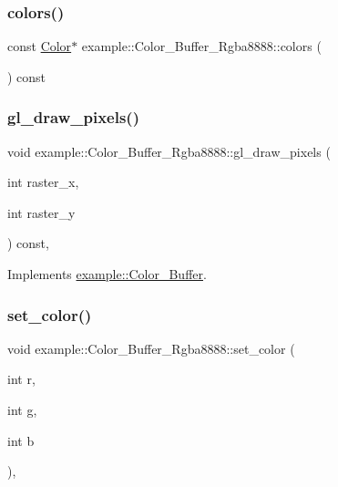 \subsubsection{\texorpdfstring{colors()}{colors()}\hspace{0.1cm}{\footnotesize\ttfamily [2/2]}}
{\footnotesize\ttfamily const \mbox{\hyperlink{structexample_1_1_color___buffer___rgba8888_1_1_color}{Color}}$\ast$ example\+::\+Color\+\_\+\+Buffer\+\_\+\+Rgba8888\+::colors (\begin{DoxyParamCaption}{ }\end{DoxyParamCaption}) const\hspace{0.3cm}{\ttfamily [inline]}}

\mbox{\label{classexample_1_1_color___buffer___rgba8888_a66e133b6fd196f02a0ba454dd3fc550f}} 
\subsubsection{\texorpdfstring{gl\_draw\_pixels()}{gl\_draw\_pixels()}}
{\footnotesize\ttfamily void example\+::\+Color\+\_\+\+Buffer\+\_\+\+Rgba8888\+::gl\+\_\+draw\+\_\+pixels (\begin{DoxyParamCaption}\item[{int}]{raster\+\_\+x,  }\item[{int}]{raster\+\_\+y }\end{DoxyParamCaption}) const\hspace{0.3cm}{\ttfamily [inline]}, {\ttfamily [virtual]}}



Implements \mbox{\hyperlink{classexample_1_1_color___buffer_a793b667028b2eb7efde2cee76066eac7}{example\+::\+Color\+\_\+\+Buffer}}.

\mbox{\label{classexample_1_1_color___buffer___rgba8888_a408bf6adf54fc9958b74d21c8f6da178}} 
\subsubsection{\texorpdfstring{set\_color()}{set\_color()}\hspace{0.1cm}{\footnotesize\ttfamily [1/2]}}
{\footnotesize\ttfamily void example\+::\+Color\+\_\+\+Buffer\+\_\+\+Rgba8888\+::set\+\_\+color (\begin{DoxyParamCaption}\item[{int}]{r,  }\item[{int}]{g,  }\item[{int}]{b }\end{DoxyParamCaption})\hspace{0.3cm}{\ttfamily [inline]}, {\ttfamily [virtual]}}



